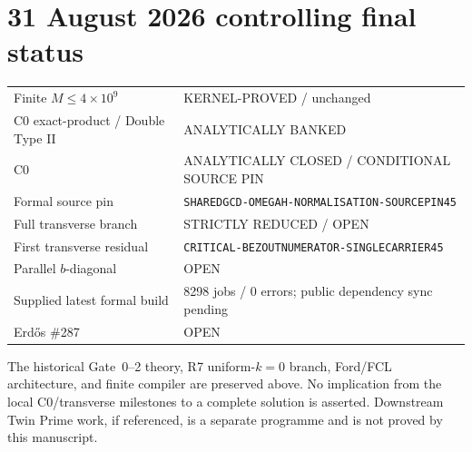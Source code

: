 \documentclass[11pt]{article}
\theoremstyle{definition}
\newcommand{\1}{\mathbf 1}
\newcommand{\status}[1]{\textsf{#1}}
\begin{document}
\section*{31 August 2026 controlling final status}
\begin{center}
\small
\begin{tabular}{ll}
\toprule
Finite $M\le4\times10^9$ & \status{KERNEL-PROVED / unchanged}\\
C0 exact-product / Double Type II & \status{ANALYTICALLY BANKED}\\
C0 & \status{ANALYTICALLY CLOSED / CONDITIONAL SOURCE PIN}\\
Formal source pin & \texttt{SHAREDGCD-OMEGAH-NORMALISATION-SOURCEPIN45}\\
Full transverse branch & \status{STRICTLY REDUCED / OPEN}\\
First transverse residual & \texttt{CRITICAL-BEZOUTNUMERATOR-SINGLECARRIER45}\\
Parallel $b$-diagonal & \status{OPEN}\\
Supplied latest formal build & \status{8298 jobs / 0 errors; public dependency sync pending}\\
Erd\H{o}s \#287 & \status{OPEN}\\
\bottomrule
\end{tabular}
\end{center}

The historical Gate~0--2 theory, R7 uniform-$k=0$ branch, Ford/FCL architecture, and finite
compiler are preserved above. No implication from the local C0/transverse milestones to a
complete solution is asserted. Downstream Twin Prime work, if referenced, is a separate
programme and is not proved by this manuscript.
\end{document}
